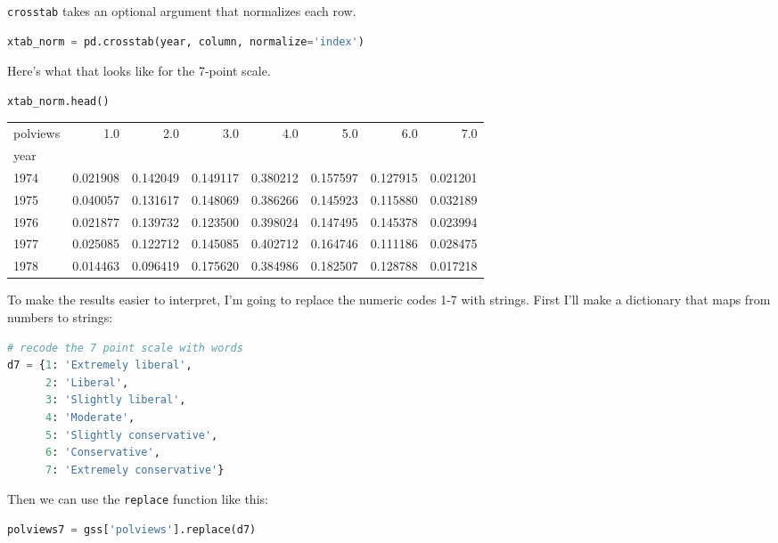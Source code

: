 \passthrough{\lstinline!crosstab!} takes an optional argument that
normalizes each row.

\begin{lstlisting}[language=Python]
xtab_norm = pd.crosstab(year, column, normalize='index')
\end{lstlisting}

Here's what that looks like for the 7-point scale.

\begin{lstlisting}[language=Python]
xtab_norm.head()
\end{lstlisting}

\begin{tabular}{lrrrrrrr}
\toprule
polviews &       1.0 &       2.0 &       3.0 &       4.0 &       5.0 &       6.0 &       7.0 \\
year &           &           &           &           &           &           &           \\
\midrule
1974 &  0.021908 &  0.142049 &  0.149117 &  0.380212 &  0.157597 &  0.127915 &  0.021201 \\
1975 &  0.040057 &  0.131617 &  0.148069 &  0.386266 &  0.145923 &  0.115880 &  0.032189 \\
1976 &  0.021877 &  0.139732 &  0.123500 &  0.398024 &  0.147495 &  0.145378 &  0.023994 \\
1977 &  0.025085 &  0.122712 &  0.145085 &  0.402712 &  0.164746 &  0.111186 &  0.028475 \\
1978 &  0.014463 &  0.096419 &  0.175620 &  0.384986 &  0.182507 &  0.128788 &  0.017218 \\
\bottomrule
\end{tabular}

To make the results easier to interpret, I'm going to replace the
numeric codes 1-7 with strings. First I'll make a dictionary that maps
from numbers to strings:

\begin{lstlisting}[language=Python]
# recode the 7 point scale with words
d7 = {1: 'Extremely liberal', 
      2: 'Liberal', 
      3: 'Slightly liberal', 
      4: 'Moderate', 
      5: 'Slightly conservative', 
      6: 'Conservative', 
      7: 'Extremely conservative'}
\end{lstlisting}

Then we can use the \passthrough{\lstinline!replace!} function like
this:

\begin{lstlisting}[language=Python]
polviews7 = gss['polviews'].replace(d7)
\end{lstlisting}


